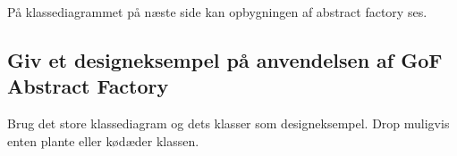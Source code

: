 På klassediagrammet på næste side kan opbygningen af abstract  factory ses.

\subsection{Giv et designeksempel på anvendelsen af GoF Abstract Factory}
Brug det store klassediagram og dets klasser som designeksempel. Drop muligvis enten plante eller kødæder klassen.



